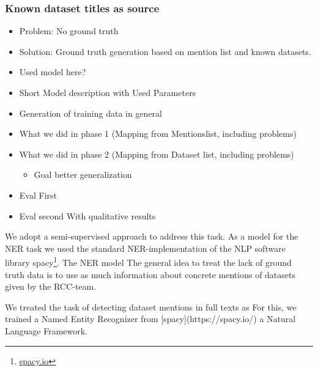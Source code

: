 \subsubsection{Known dataset titles as source}
\begin{itemize}
    \item Problem: No ground truth
    \item Solution: Ground truth generation based on mention list and known datasets.
    \item Used model here?
\end{itemize}

\begin{itemize}
    \item Short Model description with Used Parameters
    \item Generation of training data in general
    \item What we did in phase 1 (Mapping from Mentionslist, including problems)
    \item What we did in phase 2 (Mapping from Dataset list, including problems)
    \begin{itemize}
        \item Goal better generalization
    \end{itemize}
    \item Eval First
    \item Eval second With qualitative results
\end{itemize}


We adopt a semi-supervised approach to address this task.
As a model for the NER task we used the standard NER-implementation of the NLP software library spacy\footnote{\url{spacy.io}}. The NER model 
The general idea to treat the lack of ground truth data is to use as much information about concrete mentions of datasets given by the RCC-team.

We treated the task of detecting dataset mentions in full texts as
For this, we trained a Named Entity Recognizer from [spacy](https://spacy.io/) a Natural Language Framework.


